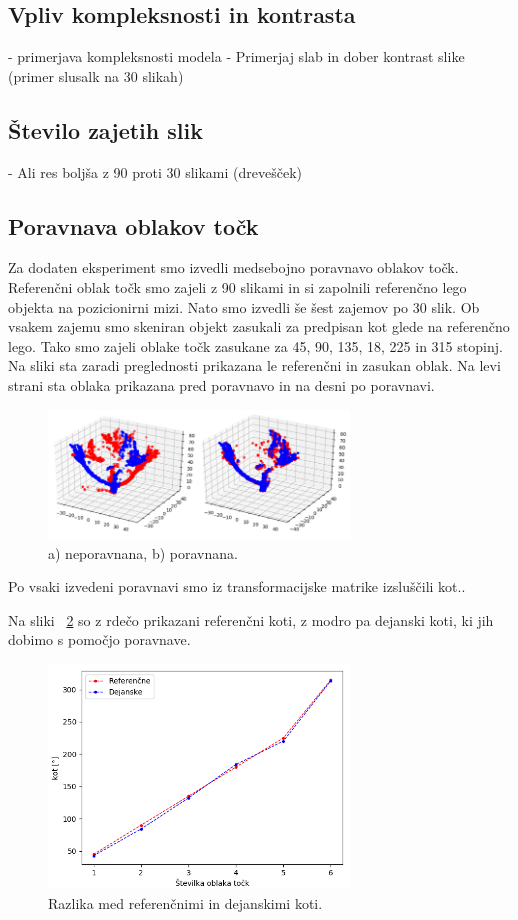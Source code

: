 \documentclass[journal,a4paper,twoside]{sty/IEEEtran}
\begin{document}
\subsection{Vpliv kompleksnosti in kontrasta}
-  primerjava kompleksnosti modela
-  Primerjaj slab in dober kontrast slike (primer slusalk na 30 slikah)

\subsection{Število zajetih slik}
-	Ali res boljša z 90 proti 30 slikami (drevešček)


\subsection{Poravnava oblakov točk}
Za dodaten eksperiment smo izvedli medsebojno poravnavo oblakov točk. Referenčni oblak točk smo zajeli z 90 slikami in si zapolnili referenčno lego objekta na pozicionirni mizi. Nato smo izvedli še šest zajemov po 30 slik. Ob vsakem zajemu smo skeniran objekt zasukali za predpisan kot glede na referenčno lego. Tako smo zajeli oblake točk zasukane za 45, 90, 135, 18, 225 in 315 stopinj. Na sliki sta zaradi preglednosti prikazana le referenčni in zasukan oblak. Na levi strani sta oblaka prikazana pred poravnavo in na desni po poravnavi. 

\begin{figure}[H]
	\centerline{\includegraphics[width=8cm]{fig/poravnava}}
	\caption{a) neporavnana, b) poravnana.}
	\label{fig:poravnava}
\end{figure}

Po vsaki izvedeni poravnavi smo iz transformacijske matrike izsluščili kot..

 Na sliki ~\ref{fig:poravnava_graf} so z rdečo prikazani referenčni koti, z modro pa dejanski koti, ki jih dobimo s pomočjo poravnave. 

\begin{figure}[H]
	\centerline{\includegraphics[width=8cm]{fig/graf_poravnave}}
	\caption{Razlika med referenčnimi in dejanskimi koti.}
	\label{fig:poravnava_graf}
\end{figure}
\end{document}
